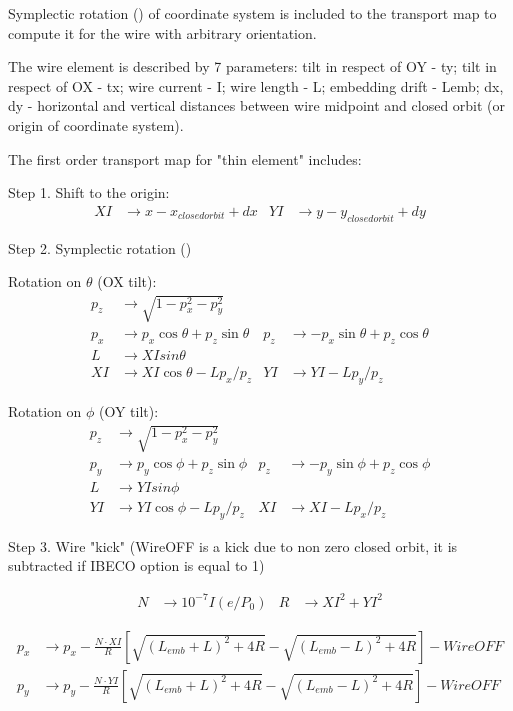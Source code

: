 \documentclass[english]{article}
\begin{document}
Symplectic rotation (\cite{forest99}) of coordinate system is included to the transport map to compute it for the wire with arbitrary orientation.  

The wire element is described by 7 parameters: 
tilt in respect of OY - ty; tilt in respect of OX - tx; wire current - I; wire length - L; embedding drift - Lemb; dx, dy - horizontal and vertical distances between wire midpoint and closed orbit (or origin of coordinate system).    

The first order transport map for "thin element" includes:

Step 1. Shift to the origin:
\begin{align*}
XI &  \to x -x_{closed orbit}  + dx &
YI &  \to y -y_{closed orbit} + dy
\end{align*}

Step 2. Symplectic rotation (\cite{forest99}) 

Rotation on $\theta$ (OX tilt):
\begin{align}
p_z & \to \sqrt{1-p_x^2-p_y^2} \\
p_x & \to   p_x \cos \theta + p_z \sin\theta &
p_z & \to - p_x \sin \theta + p_z \cos\theta \\
L & \to XI sin\theta \\
XI & \to XI \cos\theta - L p_x/p_z  &
YI & \to YI - L p_y/p_z  
\end{align}

Rotation on $\phi$ (OY tilt):
\begin{align}
p_z & \to \sqrt{1-p_x^2-p_y^2} \\
p_y & \to   p_y \cos \phi + p_z \sin\phi &
p_z & \to - p_y \sin \phi + p_z \cos\phi \\
L & \to YI sin\phi \\
YI & \to YI \cos\phi - L p_y/p_z  &
XI & \to XI - L p_x/p_z  
\end{align}

Step 3. Wire "kick" (WireOFF is a kick due to non zero closed orbit, it is subtracted if IBECO option is equal to 1)

\begin{align*}
N & \to 10^{-7} I (e/P_0) &
R & \to XI^2 + YI^2
\end{align*}

\begin{align}
p_x &\to p_x - \frac{N\cdot XI}{R}
\left[\sqrt{(L_{emb}+L)^2+4R}-\sqrt{(L_{emb}-L)^2+4R} \right] - WireOFF \\
p_y &\to p_y - \frac{N\cdot YI}{R}
\left[\sqrt{(L_{emb}+L)^2+4R}-\sqrt{(L_{emb}-L)^2+4R} \right] - WireOFF 
\end{align}
\end{document}
